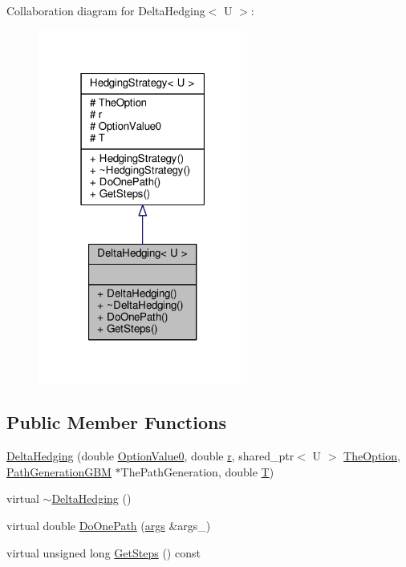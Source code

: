 Collaboration diagram for Delta\+Hedging$<$ U $>$\+:
\nopagebreak
\begin{figure}[H]
\begin{center}
\leavevmode
\includegraphics[width=195pt]{classDeltaHedging__coll__graph}
\end{center}
\end{figure}
\subsection*{Public Member Functions}
\begin{DoxyCompactItemize}
\item 
\hyperlink{classDeltaHedging_ae1e5687d0d2c9ba019e58cd2433fe81d}{Delta\+Hedging} (double \hyperlink{classHedgingStrategy_ac96528e9f4e5a0d1e5aadcc2ebdcab55}{Option\+Value0}, double \hyperlink{classHedgingStrategy_a313da7bc1911dba2a166d2c7bed5f1d7}{r}, shared\+\_\+ptr$<$ U $>$ \hyperlink{classHedgingStrategy_a65699a183423af9d947bb939ae8e907d}{The\+Option}, \hyperlink{classPathGenerationGBM}{Path\+Generation\+G\+BM} $\ast$The\+Path\+Generation, double \hyperlink{classHedgingStrategy_aedb4069f0709b49482a72b9d9c906a5e}{T})
\item 
virtual \hyperlink{classDeltaHedging_a019b8bef20aaec88a6e1e7bacb8c0015}{$\sim$\+Delta\+Hedging} ()
\item 
virtual double \hyperlink{classDeltaHedging_a670264651c7c2a3ce404bca291d2194f}{Do\+One\+Path} (\hyperlink{path__generation_8h_a75c13cde2074f502cc4348c70528572d}{args} \&args\+\_\+)
\item 
virtual unsigned long \hyperlink{classDeltaHedging_a0a6d6d2f73dfcf3425927cc45a012a2a}{Get\+Steps} () const
\end{DoxyCompactItemize}
